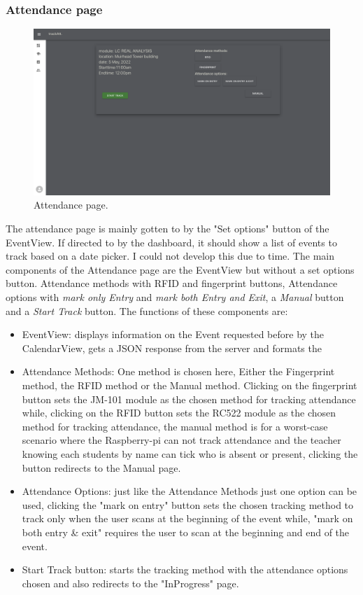 \subsubsection{Attendance page}
\begin{figure}[ht!]
  \includegraphics[scale=0.135]{Design & Implementation/images/Attendance.png}
  \caption{Attendance page.}
\end{figure}
The attendance page is mainly gotten to by the "Set options" button of the EventView. If directed to by the dashboard, it should show a list of events to track based on a date picker. I could not develop this due to time. The main components of the Attendance page are the EventView but without a set options button. Attendance methods with RFID and fingerprint buttons, Attendance options with \textit{mark only Entry} and \textit{mark both Entry and Exit}, a \textit{Manual} button and a \textit{Start Track} button. The functions of these components are:

\begin{itemize}
  \item EventView: displays information on the Event requested before by the CalendarView, gets a JSON response from the server and formats the 
  \item Attendance Methods: One method is chosen here, Either the Fingerprint method, the RFID method or the Manual method. Clicking on the fingerprint button sets the JM-101 module as the chosen method for tracking attendance while, clicking on the RFID button sets the RC522 module as the chosen method for tracking attendance, the manual method is for a worst-case scenario where the Raspberry-pi can not track attendance and the teacher knowing each students by name can tick who is absent or present, clicking the button redirects to the Manual page. 
  \item Attendance Options: just like the Attendance Methods just one option can be used, clicking the "mark on entry" button sets the chosen tracking method to track only when the user scans at the beginning of the event while, "mark on both entry \& exit" requires the user to scan at the beginning and end of the event.
  \item Start Track button: starts the tracking method with the attendance options chosen and also redirects to the "InProgress" page.  
\end{itemize}


